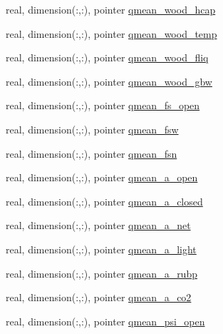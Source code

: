 \begin{DoxyCompactItemize}
\item 
real, dimension(\+:,\+:), pointer \hyperlink{structed__state__vars_1_1patchtype_a6b7fdd3fa24259cca6eaf9c83c07f715}{qmean\+\_\+wood\+\_\+hcap}
\item 
real, dimension(\+:,\+:), pointer \hyperlink{structed__state__vars_1_1patchtype_aebc80353904752b72d3bbed633a69cc2}{qmean\+\_\+wood\+\_\+temp}
\item 
real, dimension(\+:,\+:), pointer \hyperlink{structed__state__vars_1_1patchtype_a15a01645cf212fa7634ada97fb899b65}{qmean\+\_\+wood\+\_\+fliq}
\item 
real, dimension(\+:,\+:), pointer \hyperlink{structed__state__vars_1_1patchtype_a55c128836aae3fa9cfa1ae80b3d41f99}{qmean\+\_\+wood\+\_\+gbw}
\item 
real, dimension(\+:,\+:), pointer \hyperlink{structed__state__vars_1_1patchtype_a22e223e2e47734dbaf8678f2729be90c}{qmean\+\_\+fs\+\_\+open}
\item 
real, dimension(\+:,\+:), pointer \hyperlink{structed__state__vars_1_1patchtype_ad8611c6133b6ba37debb29ff26a1b3c2}{qmean\+\_\+fsw}
\item 
real, dimension(\+:,\+:), pointer \hyperlink{structed__state__vars_1_1patchtype_ab8b105f1336ae4f3488f5563abcda55b}{qmean\+\_\+fsn}
\item 
real, dimension(\+:,\+:), pointer \hyperlink{structed__state__vars_1_1patchtype_adaa7f5d8b932636c0b94fb0cb9f2e8c6}{qmean\+\_\+a\+\_\+open}
\item 
real, dimension(\+:,\+:), pointer \hyperlink{structed__state__vars_1_1patchtype_af0f6b36d9554265f8fe2f2aa59553da2}{qmean\+\_\+a\+\_\+closed}
\item 
real, dimension(\+:,\+:), pointer \hyperlink{structed__state__vars_1_1patchtype_ab3bd055b840b65643776ad9c4677847e}{qmean\+\_\+a\+\_\+net}
\item 
real, dimension(\+:,\+:), pointer \hyperlink{structed__state__vars_1_1patchtype_a596e05a9a88576ae178b0871c95767c6}{qmean\+\_\+a\+\_\+light}
\item 
real, dimension(\+:,\+:), pointer \hyperlink{structed__state__vars_1_1patchtype_a6e4a8730af027e64568670142a0a0105}{qmean\+\_\+a\+\_\+rubp}
\item 
real, dimension(\+:,\+:), pointer \hyperlink{structed__state__vars_1_1patchtype_af96a099cfaf49d8e947b7ce198a44233}{qmean\+\_\+a\+\_\+co2}
\item 
real, dimension(\+:,\+:), pointer \hyperlink{structed__state__vars_1_1patchtype_af68cf6b400fa9e9038cd6e96d6f07d17}{qmean\+\_\+psi\+\_\+open}

\end{DoxyCompactItemize}
